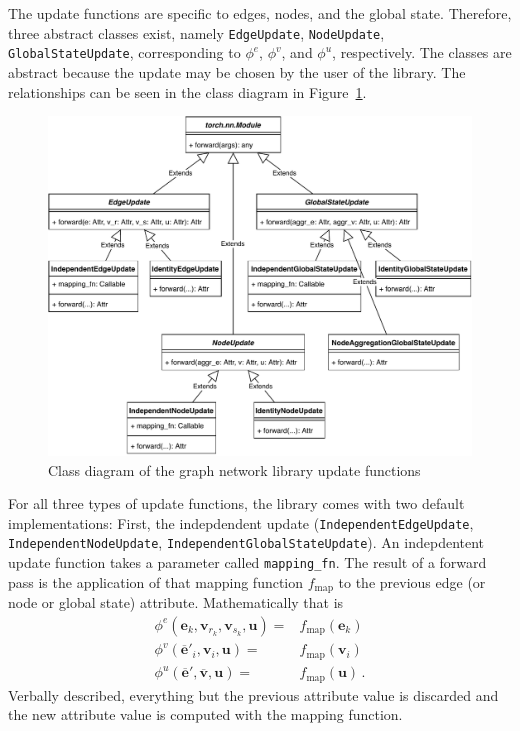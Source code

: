 The update functions are specific to edges, nodes, and the global state. Therefore, three abstract classes exist, namely \texttt{EdgeUpdate}, \texttt{NodeUpdate}, \texttt{GlobalStateUpdate}, corresponding to $\phi^e$, $\phi^v$, and $\phi^u$, respectively. The classes are abstract because the update may be chosen by the user of the library. The relationships can be seen in the class diagram in Figure~\ref{fig:classdiagramgnfunctionsupdate}.

\begin{figure}\centering
    \includegraphics[scale=0.65]{resources/graphnets-functions-update}
    \caption{Class diagram of the graph network library update functions}\label{fig:classdiagramgnfunctionsupdate}
\end{figure}

For all three types of update functions, the library comes with two default implementations: First, the indepdendent update (\texttt{IndependentEdgeUpdate}, \texttt{IndependentNodeUpdate}, \texttt{IndependentGlobalStateUpdate}). An indepdentent update function takes a parameter called \texttt{mapping\_fn}. The result of a forward pass is the application of that mapping function $f_\text{map}$ to the previous edge (or node or global state) attribute. Mathematically that is \begin{align}
\phi^e\left(\bm{e}_k,\bm{v}_{r_k},\bm{v}_{s_k},\bm{u}\right)=&f_\text{map}\left(\bm{e}_k\right)\\
\phi^v\left(\bm{\overline{e}}'_i,\bm{v}_i,\bm{u}\right)=&f_\text{map}\left(\bm{v}_i\right)\\
\phi^u\left(\bm{\overline{e}}',\bm{\overline{v}},\bm{u}\right)=&f_\text{map}\left(\bm{u}\right)\,.
\end{align}Verbally described, everything but the previous attribute value is discarded and the new attribute value is computed with the mapping function.

